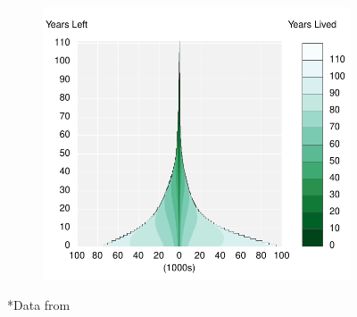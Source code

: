 \documentclass{article}
\begin{document}
\begin{figure}
\begin{subfigure}[b]{.48\linewidth}
	\label{fig:Dya}
    \includegraphics[scale=.55]{Figures/Deathsyx10.pdf}
\end{subfigure}
\caption*{*Data from }
\end{figure}
\end{document}
